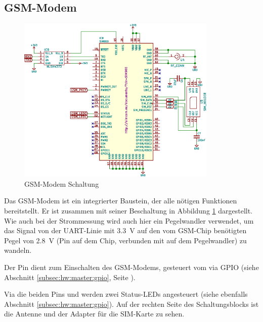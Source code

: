 \clearpage
\subsection{GSM-Modem}
\label{subsec:hw:master:gsm}

\begin{figure}[h!t]
    \centering
    \includegraphics[width=0.85\textwidth]{images/superv-sch/supervisor--sch--gsm.eps}
    \caption{GSM-Modem Schaltung}
    \label{fig:sch:master:gsm}
\end{figure}

Das GSM-Modem  ist ein  integrierter Baustein,  der alle  n\"otigen Funktionen
bereitstellt.    Er  ist   zusammen  mit   seiner  Beschaltung   in  Abbildung
\ref{fig:sch:master:gsm} dargestellt. Wie auch bei  der Strommessung wird auch
hier  ein  Pegelwandler  verwendet,  um  das Signal  von  der  UART-Linie  mit
\SI{3.3}{\volt} auf  den vom  GSM-Chip ben\"otigten Pegel  von \SI{2.8}{\volt}
(Pin    auf  dem  Chip, verbunden  mit    auf  dem
Pegelwandler) zu wandeln.

Der  Pin   dient  zum  Einschalten  des GSM-Modems,  gesteuert
vom  \Raspi  via  GPIO  (siehe  Abschnitt  \ref{subsec:hw:master:gpio},  Seite
\pageref{subsec:hw:master:gpio}).

Via die beiden Pins   und  werden zwei Status-LEDs
angesteuert (siehe  ebenfalls Abschnitt  \ref{subsec:hw:master:gpio}). Auf der
rechten Seite des  Schaltungsblocks ist die Antenne und der  Adapter f\"ur die
SIM-Karte zu sehen.
